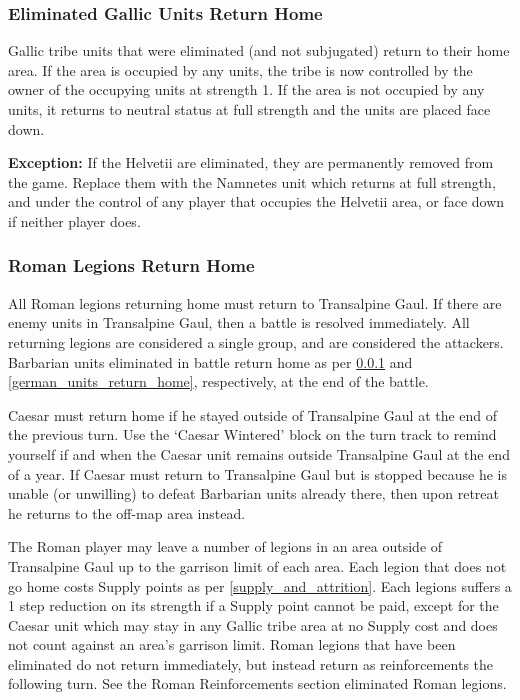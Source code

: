 \subsubsection{Eliminated Gallic Units Return Home}
\label{eliminated_gallic_units_return_home}
\par
Gallic tribe units that were eliminated (and not subjugated) return to their home area. If the area is occupied by any units, the tribe is now controlled by the owner of the occupying units at strength 1. If the area is not occupied by any units, it returns to neutral status at full strength and the units are placed face down.

\textbf{Exception:} If the Helvetii are eliminated, they are permanently removed from the game. Replace them with the Namnetes unit which returns at full strength, and under the control of any player that occupies the Helvetii area, or face down if neither player does.

\subsubsection{Roman Legions Return Home}
\par
All Roman legions returning home must return to Transalpine Gaul. If there are enemy units in Transalpine Gaul, then a battle is resolved immediately. All returning legions are considered a single group, and are considered the attackers. Barbarian units eliminated in battle return home as per \ref{eliminated_gallic_units_return_home} and \ref{german_units_return_home}, respectively, at the end of the battle.

Caesar must return home if he stayed outside of Transalpine Gaul at the end of the previous turn. Use the ‘Caesar Wintered’ block on the turn track to remind yourself if and when the Caesar unit remains outside Transalpine Gaul at the end of a year. If Caesar must return to Transalpine Gaul but is stopped because he is unable (or unwilling) to defeat Barbarian units already there, then upon retreat he returns to the off-map area instead.

The Roman player may leave a number of legions in an area outside of Transalpine Gaul up to the garrison limit of each area. Each legion that does not go home costs Supply points as per \ref{supply_and_attrition}. Each legions suffers a 1 step reduction on its strength if a Supply point cannot be paid, except for the Caesar unit which may stay in any Gallic tribe area at no Supply cost and does not count against an area's garrison limit. Roman legions that have been eliminated do not return immediately, but instead return as reinforcements the following turn. See the Roman Reinforcements section eliminated Roman legions.


